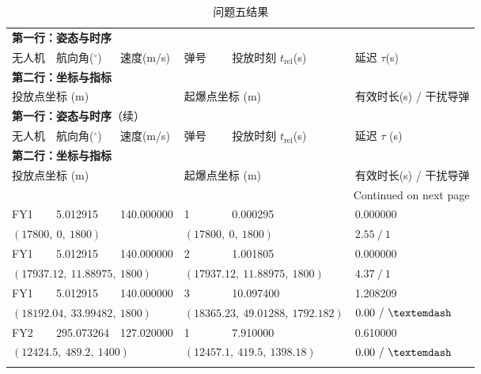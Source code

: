 \documentclass[withoutpreface,bwprint]{cumcmthesis} %
\begin{document}
\begin{longtable}{p{}p{}p{}p{}p{}p{}}
	\caption{问题五结果}\label{tab:result5_details_2rows_long}\\
	\toprule
	\multicolumn{6}{l}{\textbf{第一行：姿态与时序}}\\
	无人机 & 航向角($^\circ$) & 速度(m/s) & 弹号 & 投放时刻 $t_{\text{rel}}$(s) & 延迟 $\tau$(s) \\
	\midrule
	\multicolumn{6}{l}{\textbf{第二行：坐标与指标}}\\
	\multicolumn{3}{l}{投放点坐标 (m)} & \multicolumn{2}{l}{起爆点坐标 (m)} & 有效时长(s) / 干扰导弹 \\
	\midrule
	\endfirsthead
	
	\toprule
	\multicolumn{6}{l}{\textbf{第一行：姿态与时序}（续）}\\
	无人机 & 航向角($^\circ$) & 速度(m/s) & 弹号 & 投放时刻 $t_{\text{rel}}$(s) & 延迟 $\tau$ (s) \\
	\midrule
	\multicolumn{6}{l}{\textbf{第二行：坐标与指标}}\\
	\multicolumn{3}{l}{投放点坐标 (m)} & \multicolumn{2}{l}{起爆点坐标 (m)} & 有效时长(s) / 干扰导弹 \\
	\midrule
	\endhead
	
	\midrule
	\multicolumn{6}{r}{Continued on next page}\\
	\midrule
	\endfoot
	
	\bottomrule
	\endlastfoot
	
	FY1 & 5.012915 & 140.000000 & 1 & 0.000295 & 0.000000 \\
	\multicolumn{3}{l}{$(17800,\ 0,\ 1800)$} & \multicolumn{2}{l}{$(17800,\ 0,\ 1800)$} & $2.55\ /\ 1$ \\
	\addlinespace[2pt]
	
	FY1 & 5.012915 & 140.000000 & 2 & 1.001805 & 0.000000 \\
	\multicolumn{3}{l}{$(17937.12,\ 11.88975,\ 1800)$} & \multicolumn{2}{l}{$(17937.12,\ 11.88975,\ 1800)$} & $4.37\ /\ 1$ \\
	\addlinespace[2pt]
	
	FY1 & 5.012915 & 140.000000 & 3 & 10.097400 & 1.208209 \\
	\multicolumn{3}{l}{$(18192.04,\ 33.99482,\ 1800)$} & \multicolumn{2}{l}{$(18365.23,\ 49.01288,\ 1792.182)$} & $0.00\ /\ \textemdash$ \\
	\midrule
	
	FY2 & 295.073264 & 127.020000 & 1 & 7.910000 & 0.610000 \\
	\multicolumn{3}{l}{$(12424.5,\ 489.2,\ 1400)$} & \multicolumn{2}{l}{$(12457.1,\ 419.5,\ 1398.18)$} & $0.00\ /\ \textemdash$ \\
	\addlinespace[2pt]
	

\end{longtable}
\end{document}
